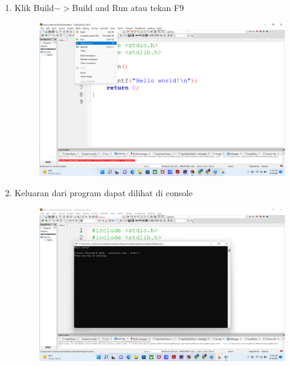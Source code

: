 \begin{enumerate}
\begin{figure}[H]
		      \caption{}
		      \label{fig:screenshot008}
	      \end{figure}
	\item Klik Build$->$Build and Run atau tekan F9
	      \begin{figure}[H]
		      \centering
		      \includegraphics[width=0.7\linewidth]{P1/img/screenshot009.png}
		      \caption{}
		      \label{fig:screenshot009}
	      \end{figure}
	\item Keluaran dari program dapat dilihat di console
	      \begin{figure}[H]
		      \centering
		      \includegraphics[width=0.7\linewidth]{P1/img/screenshot010.png}
		      \caption{}
		      \label{fig:screenshot010}
	      \end{figure}
\end{enumerate}

